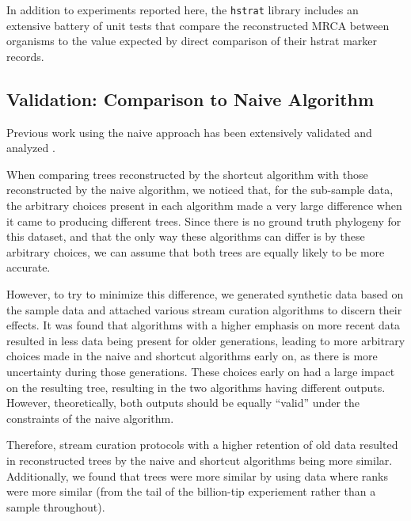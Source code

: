 In addition to experiments reported here, the \texttt{hstrat} library includes an extensive battery of unit tests that compare the reconstructed MRCA between organisms to the value expected by direct comparison of their hstrat marker records.

\subsection{Validation: Comparison to Naive Algorithm}

Previous work using the naive approach has been extensively validated and analyzed \citep{moreno2025testing}.

When comparing trees reconstructed by the shortcut algorithm with those reconstructed by the naive algorithm, we noticed that, for the sub-sample data, the arbitrary choices present in each algorithm made a very large difference when it came to producing different trees.
Since there is no ground truth phylogeny for this dataset, and that the only way these algorithms can differ is by these arbitrary choices, we can assume that both trees are equally likely to be more accurate.

However, to try to minimize this difference, we generated synthetic data based on the sample data and attached various stream curation algorithms to discern their effects.
It was found that algorithms with a higher emphasis on more recent data resulted in less data being present for older generations, leading to more arbitrary choices made in the naive and shortcut algorithms early on, as there is more uncertainty during those generations.
These choices early on had a large impact on the resulting tree, resulting in the two algorithms having different outputs. However, theoretically, both outputs should be equally ``valid'' under the constraints of the naive algorithm. 

Therefore, stream curation protocols with a higher retention of old data resulted in reconstructed trees by the naive and shortcut algorithms being more similar. Additionally, we found that trees were more similar by using data where ranks were more similar (from the tail of the billion-tip experiement rather than a sample throughout).

